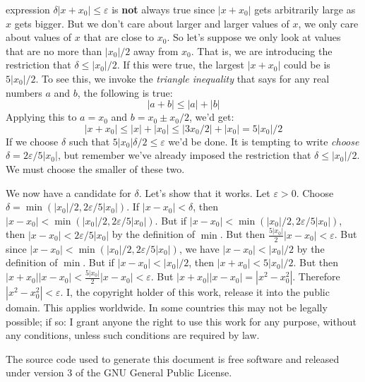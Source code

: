\documentclass{article}
\theoremstyle{normal}
\begin{document}
    expression $\delta|x+x_{0}|\leq\varepsilon$ is \textbf{not} always true
    since $|x+x_{0}|$ gets arbitrarily large as $x$ gets bigger. But we don't
    care about larger and larger values of $x$, we only care about values of
    $x$ that are close to $x_{0}$. So let's suppose we only look at values that
    are no more than $|x_{0}|/2$ away from $x_{0}$. That is, we are introducing
    the restriction that $\delta\leq|x_{0}|/2$. If this were true, the largest
    $|x+x_{0}|$ could be is $5|x_{0}|/2$. To see this, we invoke the
    \textit{triangle inequality} that says for any real numbers $a$ and $b$,
    the following is true:
    \begin{equation}
        |a+b|\leq|a|+|b|
    \end{equation}
    Applying this to $a=x_{0}$ and $b=x_{0}\pm{x}_{0}/2$, we'd get:
    \begin{equation}
        |x+x_{0}|\leq|x|+|x_{0}|\leq|3x_{0}/2|+|x_{0}|=5|x_{0}|/2
    \end{equation}
    If we choose $\delta$ such that $5|x_{0}|\delta/2\leq\varepsilon$ we'd be
    done. It is tempting to write \textit{choose}
    $\delta=2\varepsilon/5|x_{0}|$, but remember we've already imposed the
    restriction that $\delta\leq|x_{0}|/2$. We must choose the smaller of these
    two.
    \par\hfill\par
    We now have a candidate for $\delta$. Let's show that it works. Let
    $\varepsilon>0$. Choose $\delta=\min(|x_{0}|/2,2\varepsilon/5|x_{0}|)$. If
    $|x-x_{0}|<\delta$, then $|x-x_{0}|<\min(|x_{0}|/2,2\varepsilon/5|x_{0}|)$.
    But if $|x-x_{0}|<\min(|x_{0}|/2,2\varepsilon/5|x_{0}|)$, then
    $|x-x_{0}|<2\varepsilon/5|x_{0}|$ by the definition of $\min$. But then
    $\frac{5|x_{0}|}{2}|x-x_{0}|<\varepsilon$. But since
    $|x-x_{0}|<\min(|x_{0}|/2,2\varepsilon/5|x_{0}|)$, we have
    $|x-x_{0}|<|x_{0}|/2$ by the definition of $\min$. But if
    $|x-x_{0}|<|x_{0}|/2$, then $|x+x_{0}|<5|x_{0}|/2$. But then
    $|x+x_{0}||x-x_{0}|<\frac{5|x_{0}|}{2}|x-x_{0}|<\varepsilon$. But
    $|x+x_{0}||x-x_{0}|=|x^{2}-x_{0}^{2}|$. Therefore
    $|x^{2}-x_{0}^{2}|<\varepsilon$.
    \newpage
    I, the copyright holder of this work, release it into the public domain.
    This applies worldwide. In some countries this may not be legally possible;
    if so: I grant anyone the right to use this work for any purpose, without
    any conditions, unless such conditions are required by law.
    \par\hfill\par
    The source code used to generate this document is free software and released
    under version 3 of the GNU General Public License.
\end{document}
